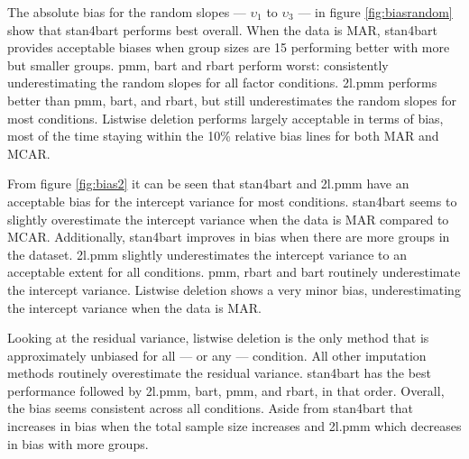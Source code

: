 \documentclass[3p,12pt,a4paper]{elsarticle}
\begin{document}
The absolute bias for the random slopes --- $\upsilon_1$ to $\upsilon_3$ --- in figure \ref{fig:biasrandom} show that stan4bart performs best overall. When the data is MAR, stan4bart provides acceptable biases when group sizes are 15 performing better with more but smaller groups. pmm, bart and rbart perform worst: consistently underestimating the random slopes for all factor conditions. 2l.pmm performs better than pmm, bart, and rbart, but still underestimates the random slopes for most conditions. Listwise deletion performs largely acceptable in terms of bias, most of the time staying within the 10\% relative bias lines for both MAR and MCAR.

From figure \ref{fig:bias2} it can be seen that stan4bart and 2l.pmm have an acceptable bias for the intercept variance for most conditions. stan4bart seems to slightly overestimate the intercept variance when the data is MAR compared to MCAR. Additionally, stan4bart improves in bias when there are more groups in the dataset. 2l.pmm slightly underestimates the intercept variance to an acceptable extent for all conditions. pmm, rbart and bart routinely underestimate the intercept variance. Listwise deletion shows a very minor bias, underestimating the intercept variance when the data is MAR. 

Looking at the residual variance, listwise deletion is the only method that is approximately unbiased for all --- or any --- condition. All other imputation methods routinely overestimate the residual variance. stan4bart has the best performance followed by 2l.pmm, bart, pmm, and rbart, in that order. Overall, the bias seems consistent across all conditions. Aside from stan4bart that increases in bias when the total sample size increases and 2l.pmm which decreases in bias with more groups. 
\end{document}
